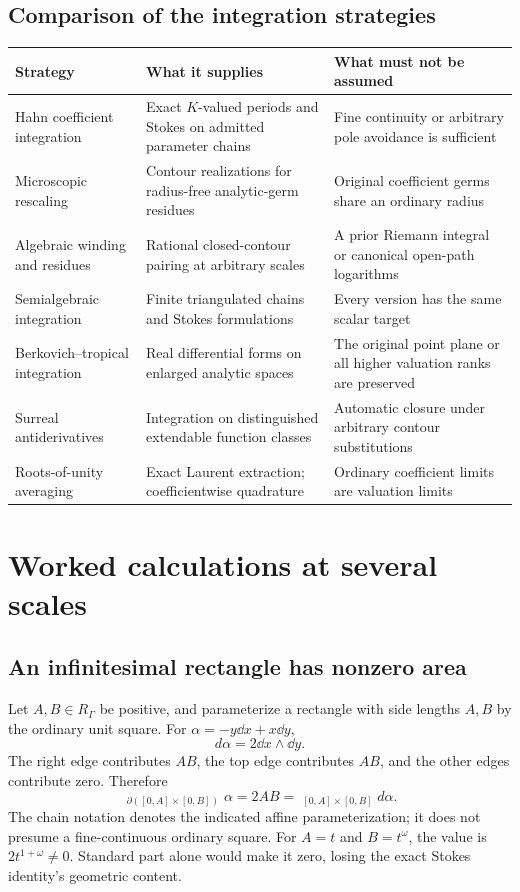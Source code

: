 \documentclass[11pt,letterpaper]{article}
\theoremstyle{definition}
\theoremstyle{remark}
\newcommand{\HInt}{\mathop{\int^{\!H}}\nolimits}
\numberwithin{equation}{section}
\begin{document}
\subsection{Comparison of the integration strategies}
\begin{center}\small
\begin{tabular}{@{}L{0.22\textwidth}L{0.33\textwidth}L{0.35\textwidth}@{}}
\toprule
Strategy & What it supplies & What must not be assumed\\
\midrule
Hahn coefficient integration & Exact $K$-valued periods and Stokes on admitted parameter chains & Fine continuity or arbitrary pole avoidance is sufficient\\[0.35em]
Microscopic rescaling & Contour realizations for radius-free analytic-germ residues & Original coefficient germs share an ordinary radius\\[0.35em]
Algebraic winding and residues & Rational closed-contour pairing at arbitrary scales & A prior Riemann integral or canonical open-path logarithms\\[0.35em]
Semialgebraic integration & Finite triangulated chains and Stokes formulations & Every version has the same scalar target\\[0.35em]
Berkovich--tropical integration & Real differential forms on enlarged analytic spaces & The original point plane or all higher valuation ranks are preserved\\[0.35em]
Surreal antiderivatives & Integration on distinguished extendable function classes & Automatic closure under arbitrary contour substitutions\\[0.35em]
Roots-of-unity averaging & Exact Laurent extraction; coefficientwise quadrature & Ordinary coefficient limits are valuation limits\\
\bottomrule
\end{tabular}
\end{center}

\section{Worked calculations at several scales}\label{sec:examples}

\subsection{An infinitesimal rectangle has nonzero area}
Let $A,B\in R_\Gamma$ be positive, and parameterize a rectangle with side lengths $A,B$ by the ordinary unit square. For $\alpha=-y\dd x+x\dd y$,
\[
 d\alpha=2\dd x\wedge\dd y.
\]
The right edge contributes $AB$, the top edge contributes $AB$, and the other edges contribute zero. Therefore
\begin{equation}\label{eq:rectangle}
 \HInt_{\partial([0,A]\times[0,B])}\alpha
 =2AB
 =\HInt_{[0,A]\times[0,B]}d\alpha.
\end{equation}
The chain notation denotes the indicated affine parameterization; it does not presume a fine-continuous ordinary square. For $A=t$ and $B=t^\omega$, the value is $2t^{1+\omega}\ne0$. Standard part alone would make it zero, losing the exact Stokes identity's geometric content.
\end{document}
